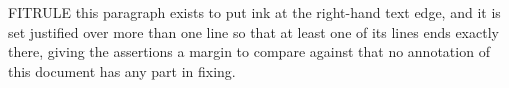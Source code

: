 
\ExAnnotFit

FITRULE this paragraph exists to put ink at the right-hand text edge, and it
is set justified over more than one line so that at least one of its lines
ends exactly there, giving the assertions a margin to compare against that
no annotation of this document has any part in fixing.

